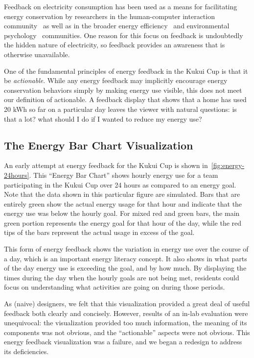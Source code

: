 \documentclass[10pt, conference, compsocconf]{IEEEtran}
\begin{document}
Feedback on electricity consumption has been used as a means for facilitating energy conservation by researchers in the human-computer interaction community~\cite{Froehlich2010} as well as in the broader energy efficiency~\cite{darby-review-2006, Faruqui09, Foster-2012} and environmental psychology~\cite{Becker78, Houwelingen89} communities. One reason for this focus on feedback is undoubtedly the hidden nature of electricity, so feedback provides an awareness that is otherwise unavailable.

One of the fundamental principles of energy feedback in the Kukui Cup is that it be \emph{actionable}. While any energy feedback may implicitly encourage energy conservation behaviors simply by making energy use visible, this does not meet our definition of actionable. A feedback display that shows that a home has used 20 kWh so far on a particular day leaves the viewer with natural questions: is that a lot? what should I do if I wanted to reduce my energy use?


\subsection{The Energy Bar Chart Visualization}


An early attempt at energy feedback for the Kukui Cup is shown in~\autoref{fig:energy-24hours}. This ``Energy Bar Chart'' shows hourly energy use for a team participating in the Kukui Cup over 24 hours as compared to an energy goal. Note that the data shown in this particular figure are simulated. Bars that are entirely green show the actual energy usage for that hour and indicate that the energy use was below the hourly goal. For mixed red and green bars, the main green portion represents the energy goal for that hour of the day, while the red tips of the bars represent the actual usage in excess of the goal.

This form of energy feedback shows the variation in energy use over the course of a day, which is an important energy literacy concept. It also shows in what parts of the day energy use is exceeding the goal, and by how much. By displaying the times during the day when the hourly goals are not being met, residents could focus on understanding what activities are going on during those periods.

As (naive) designers, we felt that this visualization provided a great deal of useful feedback both clearly and concisely. However, results of an in-lab evaluation were unequivocal: the visualization provided too much information, the meaning of its components was not obvious, and the ``actionable'' aspects were not obvious. This energy feedback visualization was a failure, and we began a redesign to address its deficiencies.
\end{document}
